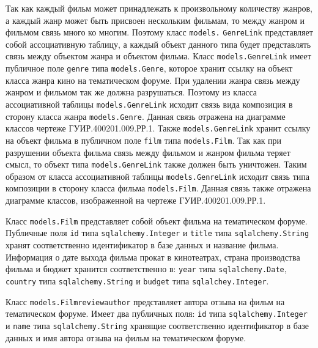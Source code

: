 Так как каждый фильм может принадлежать к произвольному количеству жанров, а каждый жанр может быть присвоен нескольким фильмам, то между жанром и фильмом связь много ко многим. Поэтому класс \texttt{mo\-dels.} \texttt{GenreLink} представляет собой ассоциативную таблицу, а каждый объект данного типа будет представлять связь между объектом жанра и объектом фильма. Класс \texttt{mo\-dels.GenreLink} имеет публичное поле \texttt{genre} типа \texttt{mo\-dels.Gen\-re}, которое хранит ссылку на объект класса жанра кино на тематическом форуме. При удалении жанра связь между жанром и фильмом так же должна разрушаться. Поэтому из класса ассоциативной таблицы \texttt{mo\-dels.GenreLink} исходит связь вида композиция в сторону класса жанра \texttt{mo\-dels.Genre}. Данная связь отражена на диаграмме классов чертеже ГУИР.400201.009.РР.1. Также \texttt{mo\-dels.GenreLink} хранит ссылку на объект фильма в публичном поле \texttt{film} типа \texttt{mo\-dels.Film}. Так как при разрушении объекта фильма связь между фильмом и жанром фильма теряет смысл, то объект типа \texttt{mo\-dels.GenreLink} также должен быть уничтожен. Таким образом от класса ассоциативной таблицы \texttt{mo\-dels.GenreLink} исходит связь типа композиции в сторону класса фильма \texttt{mo\-dels.Film}. Данная связь также отражена диаграмме классов, изображенной на чертеже ГУИР.400201.009.РР.1.

Класс \texttt{mo\-dels.Film} представляет собой объект фильма на тематическом форуме. Публичные поля \texttt{id} типа \texttt{sqlalchemy.Integer} и \texttt{title} типа \texttt{sqlalchemy.String} хранят соответственно идентификатор в базе данных и название фильма. Информация о дате выхода фильма прокат в кинотеатрах, страна производства фильма и бюджет хранится соответственно в: \texttt{year} типа \texttt{sqlal\-chemy.Date}, \texttt{country} типа \texttt{sqlalchemy.String} и \texttt{budget} типа \texttt{sql\-alchey.Integer}.

Класс \texttt{mo\-dels.Filmreviewauthor} представляет автора отзыва на фильм на тематическом форуме. Имеет два публичных поля: \texttt{id} типа \texttt{sqlal\-chemy.In\-teger} и \texttt{name} типа \texttt{sqlalchemy.String} хранящие соответственно идентификатор в базе данных и имя автора отзыва на фильм на тематическом форуме.

